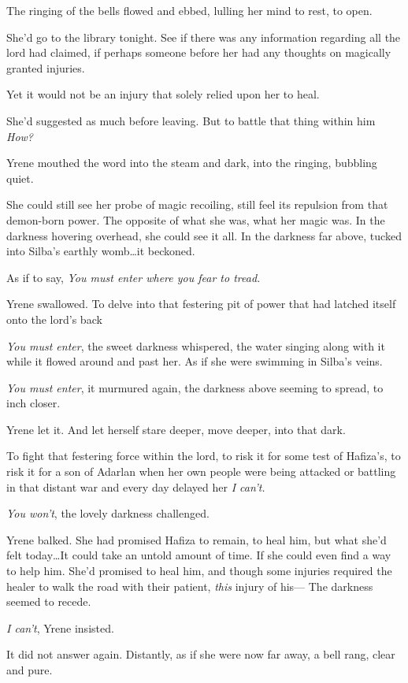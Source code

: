 The ringing of the bells flowed and ebbed, lulling her mind to rest, to open.

She'd go to the library tonight.
See if there was any information regarding all the lord had claimed, if perhaps someone before her had any thoughts on magically granted injuries.

Yet it would not be an injury that solely relied upon her to heal.

She'd suggested as much before leaving.
But to battle that thing within him  \emph{How?}

Yrene mouthed the word into the steam and dark, into the ringing, bubbling quiet.

She could still see her probe of magic recoiling, still feel its repulsion from that demon-born power.
The opposite of what she was, what her magic was.
In the darkness hovering overhead, she could see it all.
In the darkness far above, tucked into Silba's earthly womb\ldots it beckoned.

As if to say, \emph{You must enter where you fear to tread.}

Yrene swallowed.
To delve into that festering pit of power that had latched itself onto the lord's back 

\emph{You must enter}, the sweet darkness whispered, the water singing along with it while it flowed around and past her.
As if she were swimming in Silba's veins.

\emph{You must enter}, it murmured again, the darkness above seeming to spread, to inch closer.

Yrene let it.
And let herself stare deeper, move deeper, into that dark.

To fight that festering force within the lord, to risk it for some test of Hafiza's, to risk it for a son of Adarlan when her own people were being attacked or battling in that distant war and every day delayed her  \emph{I can't.}

\emph{You won't}, the lovely darkness challenged.

Yrene balked.
She had promised Hafiza to remain, to heal him, but what she'd felt today\ldots It could take an untold amount of time.
If she could even find a way to help him.
She'd promised to heal him, and though some injuries required the healer to walk the road with their patient, \emph{this} injury of his--- The darkness seemed to recede.

\emph{I can't}, Yrene insisted.

It did not answer again.
Distantly, as if she were now far away, a bell rang, clear and pure.

